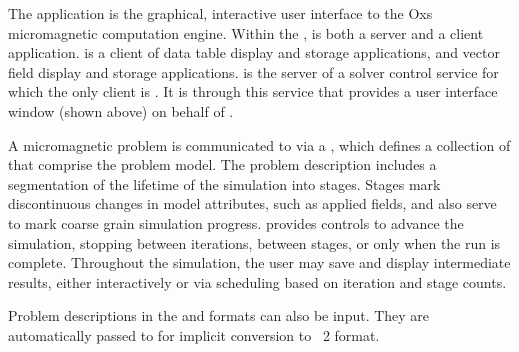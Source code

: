 \begin{center}
\end{center}

The application  is the graphical, interactive user interface
to the Oxs micromagnetic computation engine.  Within the
,  is both a server and a client
application.  is a client of data table display and storage
applications, and vector field display and storage applications.
 is the server of a solver control service for which the only
client is .  It is through
this service that  provides a user interface window (shown
above) on behalf of .

A micromagnetic problem is communicated to  via a
,
which defines a collection of 
that comprise the problem model.  The problem description includes a
segmentation of the lifetime of the simulation into stages.  Stages mark
discontinuous changes in model attributes, such as applied fields, and
also serve to mark coarse grain simulation progress.  
provides controls to advance the simulation, stopping between
iterations, between stages, or only when the run is complete.
Throughout the simulation, the user may save and display intermediate
results, either interactively or via scheduling based on iteration and
stage counts.

Problem descriptions in the  and
 formats can also be input.  They are
automatically passed to  for implicit conversion to \MIF~2 format.

